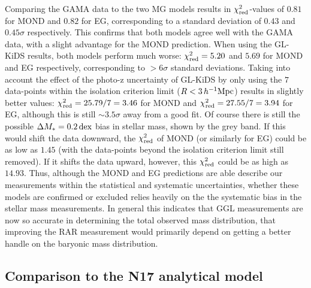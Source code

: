\documentclass[usenatbib]{mnras}
\newcommand{\hMpc}{\, h^{-1}{\rm{Mpc}} }
\newcommand{\un}[1]{_{\rm #1}}
\newcommand{\dex}{\, {\rm dex}}
\begin{document}
Comparing the GAMA data to the two MG models results in $\chi\un{red}^2$-values of $0.81$ for MOND and $0.82$ for EG, corresponding to a standard deviation of $0.43$ and $0.45 \sigma$ respectively. This confirms that both models agree well with the GAMA data, with a slight advantage for the MOND prediction. When using the GL-KiDS results, both models perform much worse: $\chi\un{red}^2=5.20$ and $5.69$ for MOND and EG respectively, corresponding to $>6 \sigma$ standard deviations. Taking into account the effect of the photo-z uncertainty of GL-KiDS by only using the $7$ data-points within the isolation criterion limit ($R < 3 \hMpc$) results in slightly better values: $\chi\un{red}^2 = 25.79/7 = 3.46$ for MOND and $\chi\un{red}^2 = 27.55/7 = 3.94$ for EG, although this is still $\sim3.5 \sigma$ away from a good fit. Of course there is still the possible $\Delta M_* = 0.2 \dex$ bias in stellar mass, shown by the grey band. If this would shift the data downward, the $\chi\un{red}^2$ of MOND (or similarly for EG) could be as low as $1.45$ (with the data-points beyond the isolation criterion limit still removed). If it shifts the data upward, however, this $\chi\un{red}^2$ could be as high as $14.93$. Thus, although the MOND and EG predictions are able describe our measurements within the statistical and systematic uncertainties, whether these models are confirmed or excluded relies heavily on the the systematic bias in the stellar mass measurements. In general this indicates that GGL measurements are now so accurate in determining the total observed mass distribution, that improving the RAR measurement would primarily depend on getting a better handle on the baryonic mass distribution.

\subsection{Comparison to the N17 analytical model}
\end{document}
